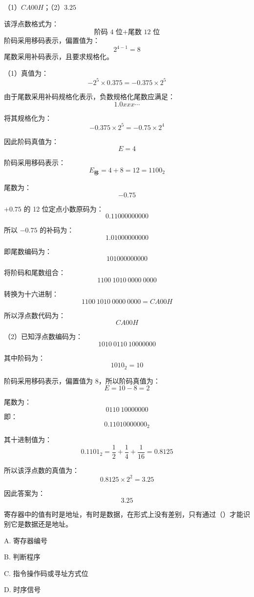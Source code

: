 \begin{answer}
（1）$CA00H$；（2）$3.25$
\end{answer}

\begin{analysisenv}
该浮点数格式为：
\[
\text{阶码 4 位}+\text{尾数 12 位}
\]
阶码采用移码表示，偏置值为：
\[
2^{4-1}=8
\]
尾数采用补码表示，且要求规格化。

（1）真值为：
\[
-2^5 \times 0.375=-0.375\times 2^5
\]

由于尾数采用补码规格化表示，负数规格化尾数应满足：
\[
1.0xxx\cdots
\]

将其规格化为：
\[
-0.375\times 2^5=-0.75\times 2^4
\]

因此阶码真值为：
\[
E=4
\]

阶码采用移码表示：
\[
E_{\text{移}}=4+8=12=1100_2
\]

尾数为：
\[
-0.75
\]

$+0.75$ 的 12 位定点小数原码为：
\[
0.11000000000
\]

所以 $-0.75$ 的补码为：
\[
1.01000000000
\]

即尾数编码为：
\[
101000000000
\]

将阶码和尾数组合：
\[
1100\ 1010\ 0000\ 0000
\]

转换为十六进制：
\[
1100\ 1010\ 0000\ 0000=CA00H
\]

所以浮点数代码为：
\[
CA00H
\]

（2）已知浮点数编码为：
\[
1010\ 0110\ 10000000
\]

其中阶码为：
\[
1010_2=10
\]

阶码采用移码表示，偏置值为 8，所以阶码真值为：
\[
E=10-8=2
\]

尾数为：
\[
0110\ 10000000
\]
即：
\[
0.11010000000_2
\]

其十进制值为：
\[
0.1101_2=\frac{1}{2}+\frac{1}{4}+\frac{1}{16}=0.8125
\]

所以该浮点数的真值为：
\[
0.8125 \times 2^2=3.25
\]

因此答案为：
\[
3.25
\]
\end{analysisenv}



\begin{question}
寄存器中的值有时是地址，有时是数据，在形式上没有差别，只有通过（）才能识别它是数据还是地址。

A. 寄存器编号

B. 判断程序

C. 指令操作码或寻址方式位

D. 时序信号
\end{question}

